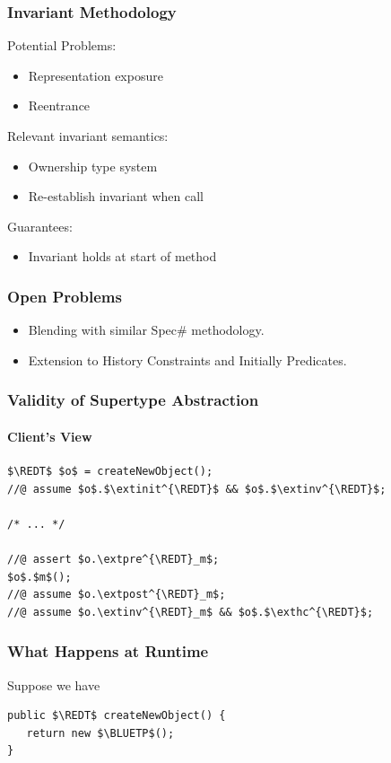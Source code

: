 \begin{frame}
\frametitle{Invariant Methodology}
Potential Problems:
\begin{itemize}
\item
Representation exposure

\item
Reentrance
\end{itemize}

Relevant invariant semantics:
\begin{itemize}
\item
Ownership type system

\item
Re-establish invariant when call
\end{itemize}

Guarantees:
\begin{itemize}
\item
Invariant holds at start of method
\end{itemize}
\end{frame}

\begin{frame}
\frametitle{Open Problems}
\begin{itemize}
\item
Blending with similar Spec\# methodology.

\item
Extension to History Constraints and Initially Predicates.
\end{itemize}
\end{frame}

\begin{frame}[fragile,label=validity]
\frametitle{Validity of Supertype Abstraction}
\framesubtitle{Client's View}

\begin{lstlisting}[mathescape=true]
$\REDT$ $o$ = createNewObject();
//@ assume $o$.$\extinit^{\REDT}$ && $o$.$\extinv^{\REDT}$;

/* ... */

//@ assert $o.\extpre^{\REDT}_m$;
$o$.$m$();
//@ assume $o.\extpost^{\REDT}_m$;
//@ assume $o.\extinv^{\REDT}_m$ && $o$.$\exthc^{\REDT}$;
\end{lstlisting}
\end{frame}

\begin{frame}[fragile]
\frametitle{What Happens at Runtime}

Suppose we have

\begin{lstlisting}[mathescape=true]
public $\REDT$ createNewObject() {
   return new $\BLUETP$();
}
\end{lstlisting}
\end{frame}

